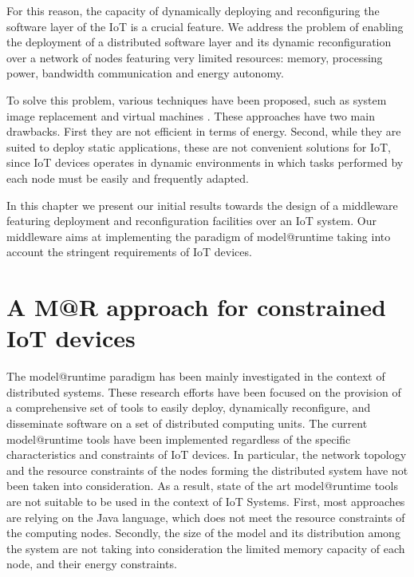 For this reason, the capacity of dynamically deploying and reconfiguring the software layer of the IoT is a crucial feature.
We address the problem of enabling the deployment of a distributed software layer and its dynamic reconfiguration over a network of nodes featuring very limited resources: memory, processing power, bandwidth communication and energy autonomy. 

To solve this problem, various techniques have been proposed, such as system image replacement \cite{hui2004dynamic} and virtual machines \cite{koshy2005vmstar}. 
These approaches have two main drawbacks. 
First they are not efficient in terms of energy. 
Second, while they are suited to deploy static applications, these are not convenient solutions for IoT, since IoT devices operates in dynamic environments in which tasks performed by each node must be easily and frequently adapted.

In this chapter we present our initial results towards the design of a middleware featuring deployment and reconfiguration facilities over an IoT system. 
Our middleware aims at implementing the paradigm of model@runtime taking into account the stringent requirements of IoT devices.


\section{A M@R approach for constrained IoT devices}
The model@runtime paradigm has been mainly investigated in the context of distributed systems. 
These research efforts have been focused on the provision of a comprehensive set of tools to easily deploy, dynamically reconfigure, and disseminate software on a set of distributed computing units.
The current model@runtime tools have been implemented regardless of the specific characteristics and constraints of IoT devices.
In particular, the network topology and the resource constraints of the nodes forming the distributed system have not been taken into consideration.
As a result, state of the art model@runtime tools are not suitable to be used in the context of IoT Systems.
First, most approaches are relying on the Java language, which does not meet the resource constraints of the computing nodes. 
Secondly, the size of the model and its distribution among the system are not taking into consideration the limited memory capacity of each node, and their energy constraints.

